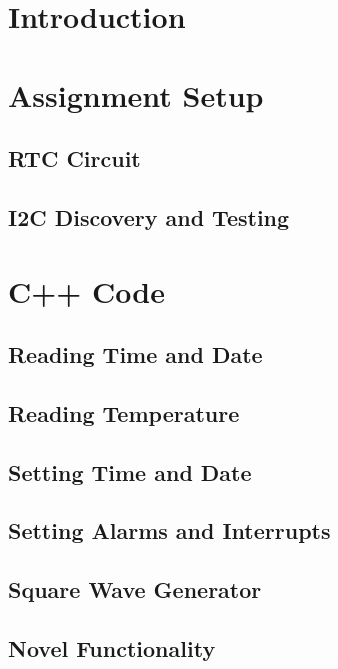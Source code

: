 \documentclass[a4paper 12pt]{article}
\begin{document}
\hypersetup{pageanchor=false}

\hypersetup{pageanchor=true}

\tableofcontents
\clearpage
\lstlistoflistings
\clearpage
\section{Introduction}

\section{Assignment Setup}
\subsection{RTC Circuit}

\subsection{I2C Discovery and Testing}\label{I2Cdisc}

\section{C++ Code}

\subsection{Reading Time and Date}

\subsection{Reading Temperature}

\subsection{Setting Time and Date}

\subsection{Setting Alarms and Interrupts}

\subsection{Square Wave Generator}

\subsection{Novel Functionality}

\end{document}
